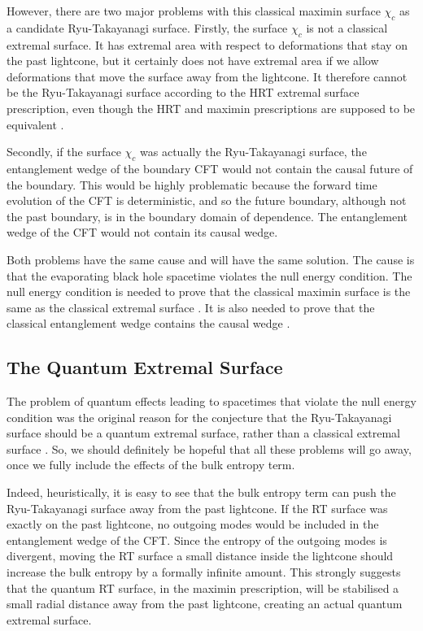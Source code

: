 \documentclass[12pt]{article}
\begin{document}
However, there are two major problems with this classical maximin surface $\chi_c$ as a candidate Ryu-Takayanagi surface. 
Firstly, the surface $\chi_c$ is not a classical extremal surface. It has extremal area with respect to deformations that stay on the past lightcone, but it certainly does not have extremal area if we allow deformations that move the surface away from the lightcone. It therefore cannot be the Ryu-Takayanagi surface according to the HRT extremal surface prescription, even though the HRT and maximin prescriptions are supposed to be equivalent \cite{wall2014maximin}.

Secondly, if the surface $\chi_c$ was actually the Ryu-Takayanagi surface, the entanglement wedge of the boundary CFT would not contain the causal future of the boundary. This would be highly problematic because the forward time evolution of the CFT is deterministic, and so the future boundary, although not the past boundary, is in the boundary domain of dependence. The entanglement wedge of the CFT would not contain its causal wedge.

Both problems have the same cause and will have the same solution. The cause is that the evaporating black hole spacetime violates the null energy condition. The null energy condition is needed to prove that the classical maximin surface is the same as the classical extremal surface \cite{wall2014maximin}. It is also needed to prove that the classical entanglement wedge contains the causal wedge \cite{wall2014maximin}.

\subsection{The Quantum Extremal Surface} \label{sec:extremal}
The problem of quantum effects leading to spacetimes that violate the null energy condition was the original reason for the conjecture that the Ryu-Takayanagi surface should be a quantum extremal surface, rather than a classical extremal surface \cite{engelhardt2015quantum}. So, we should definitely be hopeful that all these problems will go away, once we fully include the effects of the bulk entropy term.

Indeed, heuristically, it is easy to see that the bulk entropy term can push the Ryu-Takayanagi surface away from the past lightcone. If the RT surface was exactly on the past lightcone, no outgoing modes would be included in the entanglement wedge of the CFT. Since the entropy of the outgoing modes is divergent, moving the RT surface a small distance inside the lightcone should increase the bulk entropy by a formally infinite amount. This strongly suggests that the quantum RT surface, in the maximin prescription, will be stabilised a small radial distance away from the past lightcone, creating an actual quantum extremal surface.
\end{document}
